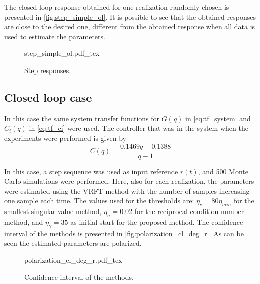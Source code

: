 The closed loop response obtained for one realization randomly chosen is presented in \autoref{fig:step_simple_ol}.
It is possible to see that the obtained responses are close to the desired one, different from the obtained response when all data is used to estimate the parameters.
\begin{figure}[h!]
  \centering
  \def\svgwidth{\columnwidth}
  {\footnotesize{step_simple_ol.pdf_tex}}
  \caption{\label{fig:step_simple_ol} Step responses.}
\end{figure}


\subsection{Closed loop case}
In this case the same system transfer functions for $G(q)$ in \eqref{eq:tf_system} and $C_i(q)$ in \eqref{eq:tf_ci} were used.
The controller that was in the system when the experiments were performed is given by
\begin{equation*}
	C(q) = \frac{0.1469q - 0.1388}{q-1}
\end{equation*}


In this case, a step sequence was used as input reference $r(t)$, and 500 Monte Carlo simulations were performed.
Here, also for each realization, the parameters were estimated using the VRFT method with the number of samples increasing one sample each time.
The values used for the thresholds are: $\eta_c = 80\eta_{min} $ for the smallest singular value method, $\eta_n = 0.02$ for the reciprocal condition number method, and $\eta_\gamma = 35$ as initial start for the proposed method.
The confidence interval of the methods is presented in \autoref{fig:polarization_cl_deg_r}.
As can be seen the estimated parameters are polarized.
\begin{figure}[h!]
  \centering
  \def\svgwidth{\columnwidth}
  {\footnotesize{polarization_cl_deg_r.pdf_tex}}
  \caption{\label{fig:polarization_cl_deg_r} Confidence interval of the methods.}
\end{figure}

